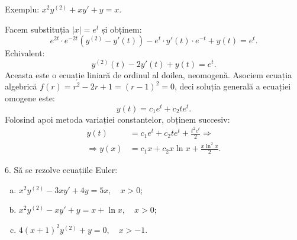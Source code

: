\documentclass[11pt,a4paper]{article}
\theoremstyle{dotless}
\theoremstyle{dotlessdr}
\begin{document}
Exemplu: $x^2 y^{(2)} + xy' + y = x$.

Facem substituția $|x| = e^t$ și obținem:
\[
  e^{2t} \cdot e^{-2t}(y^{(2)} - y'(t)) - e^t \cdot y'(t) \cdot e^{-t} + y(t) = e^t.
\]
Echivalent:
\[
  y^{(2)}(t) - 2y'(t) + y(t) = e^t.
\]
Aceasta este o ecuație liniară de ordinul al doilea, neomogenă. Asociem ecuația
algebrică $f(r) = r^2 - 2r + 1 = (r - 1)^2 = 0$, deci soluția generală a ecuației
omogene este:
\[
  y(t) = c_1 e^t + c_2 te^t.
\]
Folosind apoi metoda variației constantelor, obținem succesiv:
\begin{align*}
  y(t) &= c_1 e^t + c_2te^t + \frac{t^2 e^t}{2} \Rightarrow \\
  \Rightarrow y(x) &= c_1 x + c_2 x \ln x + \frac{x\ln^2 x}{2}.
\end{align*}

\vspace{1cm}

6. Să se rezolve ecuațiile Euler:
\begin{enumerate}[(a)]
\item $x^2 y^{(2)} - 3xy' + 4y = 5x, \quad x > 0$;
\item $x^2 y^{(2)} - xy' + y = x + \ln x, \quad x > 0$;
\item $4(x + 1)^2 y^{(2)} + y = 0, \quad x > -1$.
\end{enumerate}
\end{document}
